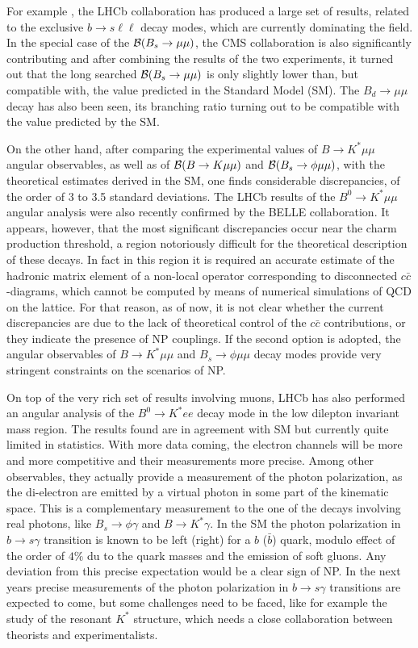 For example , the LHCb collaboration has produced a large set of results, related to the exclusive $b \to s\ell \ell $ decay modes, which  are currently dominating the field.  
In the special case of the ${\cal B}(B_s\rightarrow \mu\mu)$, the CMS collaboration is also significantly contributing and after combining the results of the two experiments, 
it turned out that the long searched ${\cal B}(B_s\rightarrow \mu\mu)$ is only slightly lower than, but compatible with, the value
predicted in the Standard Model (SM). The $B_d\to \mu\mu$ decay has also been seen, its branching ratio turning out to be compatible with the value predicted by the SM. 
\par
On the other hand,  after comparing the experimental values of $B\to K^\ast \mu\mu$  angular observables, as well as of ${\cal B}(B\rightarrow K \mu\mu)$ and ${\cal B}(B_s\rightarrow \phi \mu\mu)$, with the theoretical estimates derived in the SM, 
one finds considerable discrepancies, of the order of 3 to 3.5 standard deviations.  The LHCb results of the $B^0\to K^\ast \mu\mu$  angular analysis were also recently confirmed  by the BELLE collaboration.  
It appears, however, that the most significant discrepancies occur near the charm production threshold, a region notoriously difficult for the theoretical 
description of these decays. In fact in this region it is required an accurate estimate of the hadronic matrix element of a non-local operator corresponding to disconnected $c\bar c$-diagrams, which 
cannot be computed by means of numerical simulations of QCD on the lattice. For that reason, as of now, it is not clear whether the current discrepancies are due to the lack of theoretical 
control of the $c\bar c$ contributions, or they indicate the presence of NP couplings. If the second option is adopted, the angular observables of $B\to K^\ast \mu\mu$ and $B_s\to \phi \mu\mu$ 
decay modes provide very stringent constraints on the scenarios of NP. 

On top of the very rich set of results involving muons, LHCb has also performed an angular analysis  of the $B^0\to K^\ast e e $ decay mode in the low dilepton invariant mass region. The results found  are in agreement with SM but currently quite limited in statistics.    With more data coming, the electron channels will be more and more competitive and their measurements more precise. Among other observables, they actually  provide a  measurement of the photon polarization, as the di-electron are emitted by a virtual photon in some part of the kinematic space.  This is a complementary measurement to the one of the decays involving real photons, like $B_s \to \phi \gamma$ and $B\to K^* \gamma$.  In the SM the photon polarization  in $b \to s \gamma$ transition is  known to be left (right) for a $b$ ($\bar b$) quark, modulo effect of the order of $4\%$  du to the quark masses and the emission of soft gluons. Any deviation from this precise expectation would be a clear sign of NP.  In the next years precise measurements of the photon polarization in $b \to s \gamma$ transitions are expected to come, but some challenges need to be faced, like for example the study of the resonant $K^*$ structure, which needs a close collaboration between theorists and experimentalists. 

